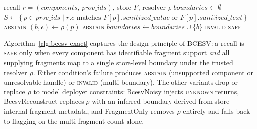 \documentclass[conference,compsoc]{IEEEtran}
\begin{document}
\begin{algorithm}[!ht]
\caption{BCESV-Exact verification (\textsc{invalid} / \textsc{safe} / \textsc{abstain}).}
\label{alg:bcesv-exact}
\begin{algorithmic}[1]
\REQUIRE recall $r = (\mathit{components},\, \mathit{prov\_ids})$, store $F$, resolver $\rho$
\STATE $\mathit{boundaries} \gets \emptyset$
  \STATE $S \gets \{\, p \in \mathit{prov\_ids} \mid r.c \text{ matches } F[p].\mathit{sanitized\_value} \text{ or } F[p].\mathit{sanitized\_text}\,\}$
    \RETURN \textsc{abstain}
  \ENDIF
    \STATE $(b, e) \gets \rho(p)$
      \RETURN \textsc{abstain}
    \ENDIF
    \STATE $\mathit{boundaries} \gets \mathit{boundaries} \cup \{b\}$
  \ENDFOR
\ENDFOR
{}
  \RETURN \textsc{invalid}
\ELSE
  \RETURN \textsc{safe}
\ENDIF
\end{algorithmic}
\end{algorithm}

Algorithm~\ref{alg:bcesv-exact} captures the design principle of BCESV: a recall is \textsc{safe} only when every component has identifiable fragment support \emph{and} all supplying fragments map to a single store-level boundary under the trusted resolver $\rho$. Either condition's failure produces \textsc{abstain} (unsupported component or unresolvable handle) or \textsc{invalid} (multi-boundary). The other variants drop or replace $\rho$ to model deployer constraints: BcesvNoisy injects \textsc{unknown} returns, BcesvReconstruct replaces $\rho$ with an inferred boundary derived from store-internal fragment metadata, and FragmentOnly removes $\rho$ entirely and falls back to flagging on the multi-fragment count alone.
\end{document}
